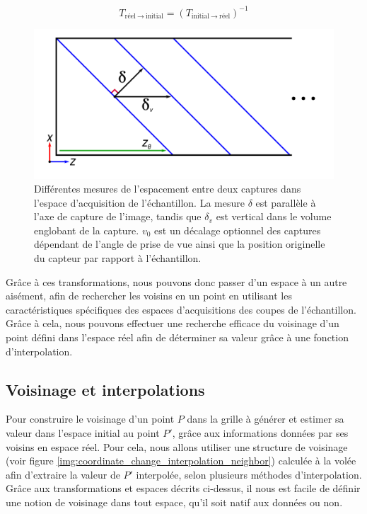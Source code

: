 {{{            $$T_{\text{réel}~\rightarrow~\text{initial}} = (T_{\text{initial}~\rightarrow~\text{réel}})^{-1}
            $$
            \begin{figure}[htp]
                \centering
                \includegraphics[width=.6\linewidth]{img/images_spacing.png}
                \caption{Différentes mesures de l'espacement entre deux captures dans l'espace d'acquisition de l'échantillon. La mesure $\delta$ est parallèle à l'axe de capture de l'image, tandis que $\delta_v$ est vertical dans le volume englobant de la capture. $v_0$ est un décalage optionnel des captures dépendant de l'angle de prise de vue ainsi que la position originelle du capteur par rapport à l'échantillon.}
                \label{img:images_spacing}
            \end{figure}

            Grâce à ces transformations, nous pouvons donc passer d'un espace à un autre aisément, afin de rechercher les voisins en un point en utilisant les caractéristiques spécifiques des espaces d'acquisitions des coupes de l'échantillon. Grâce à cela, nous pouvons effectuer une recherche efficace du voisinage d'un point défini dans l'espace réel afin de déterminer sa valeur grâce à une fonction d'interpolation.
		}
		
		\subsection{Voisinage et interpolations}
		{
            Pour construire le voisinage d'un point $P$ dans la grille à générer et estimer sa valeur dans l'espace initial au point $P'$, grâce aux informations données par ses voisins en espace réel. Pour cela, nous allons utiliser une structure de voisinage (voir figure \ref{img:coordinate_change_interpolation_neighbor}) calculée à la volée afin d'extraire la valeur de $P'$ interpolée, selon plusieurs méthodes d'interpolation. Grâce aux transformations et espaces décrits ci-dessus, il nous est facile de définir une notion de voisinage dans tout espace, qu'il soit natif aux données ou non.

}}}
